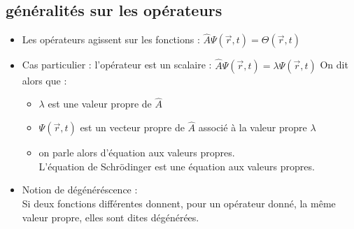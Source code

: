 \documentclass[../main.tex]{subfile}
\begin{document}
\subsection{généralités sur les opérateurs}
\begin{itemize}
	\item Les opérateurs agissent sur les fonctions : $\hat{A}\Psi(\vec{r}, t) = \Theta(\vec{r}, t)$
	\item Cas particulier : l'opérateur est un scalaire : $\hat{A}\Psi(\vec{r}, t) = \lambda \Psi(\vec{r}, t)$
	On dit alors que :\\
	\begin{itemize}
		\item $\lambda$ est une valeur propre de $\hat{A}$
		\item $\Psi(\vec{r}, t)$ est un vecteur propre de $\hat{A}$ associé à la valeur propre $\lambda$
		\item on parle alors d'équation aux valeurs propres.\\
		L'équation de Schrödinger est une équation aux valeurs propres.
	\end{itemize}
	\item Notion de dégénéréscence : \\
	Si deux fonctions différentes donnent, pour un opérateur donné, la même valeur propre, elles sont dites dégénérées.
\end{itemize}
\end{document}
